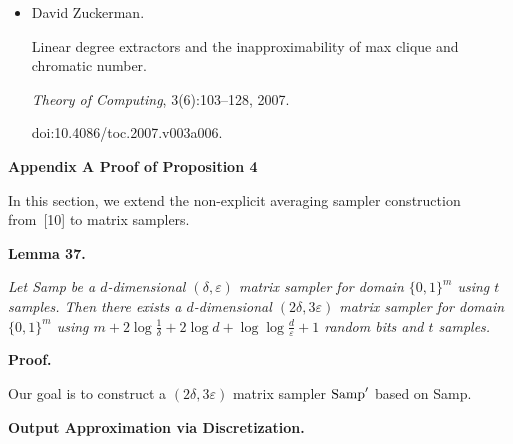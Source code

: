 \documentclass[10pt,a4paper]{article}
\begin{document}
\begin{itemize}
\item[] 
[44]

David Zuckerman.


Linear degree extractors and the inapproximability of max clique and
chromatic number.


\emph{Theory of Computing}, 3(6):103–128, 2007.


doi:10.4086/toc.2007.v003a006.





\end{itemize}




\par\medskip\noindent\textbf{
Appendix A Proof of Proposition 4
}\par




In this section, we extend the non-explicit averaging sampler construction from [10] to matrix samplers.\par





\par\medskip\noindent\textbf{
\textbf{Lemma 37}\textbf{.}
}\par



\emph{Let Samp be a $d$-dimensional $(\delta,\varepsilon)$ matrix sampler for domain $\{0,1\}^{m}$ using $t$ samples. Then there exists a $d$-dimensional $(2\delta,3\varepsilon)$ matrix sampler for domain $\{0,1\}^{m}$ using $m+2\log\frac{1}{\delta}+2\log d+\log\log\frac{d}{\varepsilon}+1$ random bits and $t$ samples.}\par






\par\medskip\noindent\textbf{Proof.}\par




Our goal is to construct a $(2\delta,3\varepsilon)$ matrix sampler $\textup{{Samp}}^{\prime}$ based on Samp.\par





\par\medskip\noindent\textbf{Output Approximation via Discretization.}\par
\end{document}
